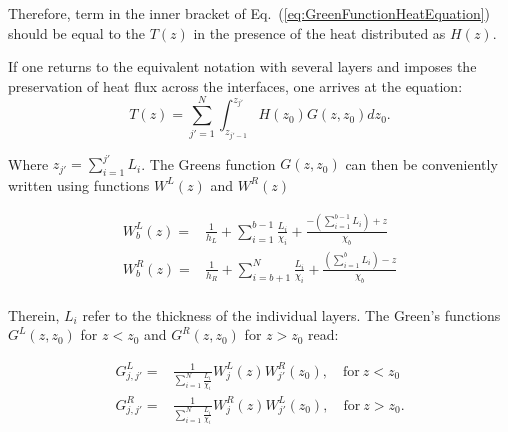 \documentclass[%
9pt,
 aip,
rsi,%
 amsmath,amssymb,
preprint,%
]{revtex4-1}
\begin{document}
Therefore, term in the inner bracket of Eq.~(\ref{eq:GreenFunctionHeatEquation}) should be equal to the $T(z)$ in the presence of the heat distributed as $H(z)$. 

If one returns to the equivalent notation with several layers and imposes the preservation of heat flux across the interfaces, one arrives at the equation: %
\begin{equation}
	T(z) = \sum_{j'=1}^{N} \int_{z_{j'-1}}^{z_{j'}} H(z_0) G(z,z_0) dz_0.
    \label{eq:GreenFunctionSolution}
\end{equation}

Where $z_{j'}=\sum_{i=1}^{j'} L_i$.
The Greens function $G(z,z_0)$ can then be conveniently written using functions $W^L(z)$ and $W^R(z)$ %


\begin{subequations}
	 \begin{align}
		W_b^L(z) =& \frac{1}{h_L}+\sum_{i=1}^{b-1} \frac{L_i}{\chi_i} + \frac{-\left( \sum_{i=1}^{b-1} L_i \right) + z}{\chi_b} \label{eq:WL}\\
        W_b^R(z) =& \frac{1}{h_R}+\sum_{i=b+1}^{N} \frac{L_i}{\chi_i} + \frac{\left( \sum_{i=1}^{b} L_i \right)  - z}{\chi_b} \label{eq:WR}\\
	\end{align}
    \label{eq:Wfunction}
\end{subequations}

Therein, $L_{i}$ refer to the thickness of the individual layers. The Green's functions $G^{L}(z,z_0)$ for $z<z_0$ and $G^{R}(z,z_0)$ for $z>z_0$ read:

\begin{subequations}
	 \begin{align}
        G_{j,j'}^L =& \frac{1}{\sum_{i=1}^{N} \frac{L_i}{\chi_i}} W^L_{j}(z) W^R_{j'}(z_0), \quad \mathrm{for~} z<z_0 \label{eq:GL}\\
        G_{j,j'}^R =& \frac{1}{\sum_{i=1}^{N} \frac{L_i}{\chi_i}} W^R_{j}(z) W^L_{j'}(z_0), \quad \mathrm{for~} z>z_0. \label{eq:GR}
	\end{align}
    \label{eq:greenfunction}
\end{subequations}
\end{document}
